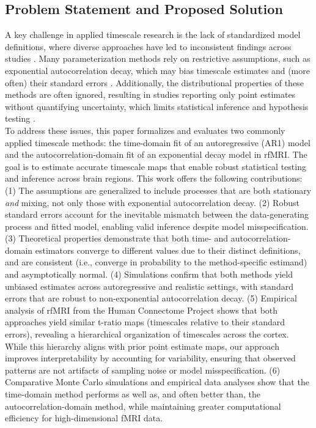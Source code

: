 \documentclass[9pt]{article}
\begin{document}
\subsection{Problem Statement and Proposed Solution}
A key challenge in applied timescale research is the lack of standardized model definitions, where diverse approaches have led to inconsistent findings across studies \citep{zeraati_flexible_2022, fallon_timescales_2020, shafiei_topographic_2020}. Many parameterization methods rely on restrictive assumptions, such as exponential autocorrelation decay, which may bias timescale estimates and (more often) their standard errors \citep{woolrich_temporal_2001, zeraati_flexible_2022, raut_time_2019}. Additionally, the distributional properties of these methods are often ignored, resulting in studies reporting only point estimates without quantifying uncertainty, which limits statistical inference and hypothesis testing \citep{newey_simple_1987, white_nonlinear_1984}.\\

To address these issues, this paper formalizes and evaluates two commonly applied timescale methods: the time-domain fit of an autoregressive (AR1) model and the autocorrelation-domain fit of an exponential decay model in rfMRI. The goal is to estimate accurate timescale maps that enable robust statistical testing and inference across brain regions. This work offers the following contributions: (1) The assumptions are generalized to include processes that are both stationary \emph{and} mixing, not only those with exponential autocorrelation decay. (2) Robust standard errors account for the inevitable mismatch between the data-generating process and fitted model, enabling valid inference despite model misspecification. (3) Theoretical properties demonstrate that both time- and autocorrelation-domain estimators converge to different values due to their distinct definitions, and are consistent (i.e., converge in probability to the method-specific estimand) and asymptotically normal. (4) Simulations confirm that both methods yield unbiased estimates across autoregressive and realistic settings, with standard errors that are robust to non-exponential autocorrelation decay. (5) Empirical analysis of rfMRI from the Human Connectome Project shows that both approaches yield similar t-ratio maps (timescales relative to their standard errors), revealing a hierarchical organization of timescales across the cortex. While this hierarchy aligns with prior point estimate maps, our approach improves interpretability by accounting for variability, ensuring that observed patterns are not artifacts of sampling noise or model misspecification. (6) Comparative Monte Carlo simulations and empirical data analyses show that the time-domain method performs as well as, and often better than, the autocorrelation-domain method, while maintaining greater computational efficiency for high-dimensional fMRI data.\\
\end{document}
